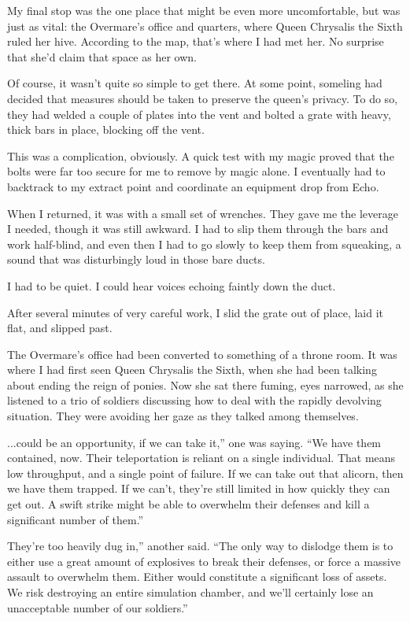 My final stop was the one place that might be even more uncomfortable, but was just as vital: the Overmare’s office and quarters, where Queen Chrysalis the Sixth ruled her hive. According to the map, that’s where I had met her. No surprise that she’d claim that space as her own.

Of course, it wasn’t quite so simple to get there. At some point, someling had decided that measures should be taken to preserve the queen’s privacy. To do so, they had welded a couple of plates into the vent and bolted a grate with heavy, thick bars in place, blocking off the vent.

This was a complication, obviously. A quick test with my magic proved that the bolts were far too secure for me to remove by magic alone. I eventually had to backtrack to my extract point and coordinate an equipment drop from Echo.

When I returned, it was with a small set of wrenches. They gave me the leverage I needed, though it was still awkward. I had to slip them through the bars and work half-blind, and even then I had to go slowly to keep them from squeaking, a sound that was disturbingly loud in those bare ducts.

I had to be quiet. I could hear voices echoing faintly down the duct.

After several minutes of very careful work, I slid the grate out of place, laid it flat, and slipped past.

The Overmare’s office had been converted to something of a throne room. It was where I had first seen Queen Chrysalis the Sixth, when she had been talking about ending the reign of ponies. Now she sat there fuming, eyes narrowed, as she listened to a trio of soldiers discussing how to deal with the rapidly devolving situation. They were avoiding her gaze as they talked among themselves.

\leavevmode{}...could be an opportunity, if we can take it,” one was saying. “We have them contained, now. Their teleportation is reliant on a single individual. That means low throughput, and a single point of failure. If we can take out that alicorn, then we have them trapped. If we can’t, they’re still limited in how quickly they can get out. A swift strike might be able to overwhelm their defenses and kill a significant number of them.”

\leavevmode{}They’re too heavily dug in,” another said. “The only way to dislodge them is to either use a great amount of explosives to break their defenses, or force a massive assault to overwhelm them. Either would constitute a significant loss of assets. We risk destroying an entire simulation chamber, and we’ll certainly lose an unacceptable number of our soldiers.”

